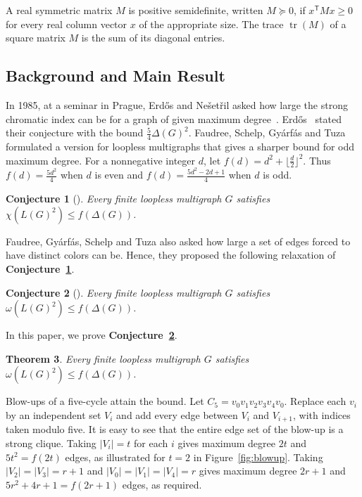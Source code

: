 \documentclass[preprint,11pt,numbers]{elsarticle-arxiv}
\numberwithin{equation}{section}
\newtheorem{theorem}{Theorem}[section]
\newtheorem{conjecture}[theorem]{Conjecture}
\theoremstyle{definition}
\DeclareMathOperator{\tr}{tr}
\begin{document}
A real symmetric matrix $M$ is positive semidefinite, written
$M\succeq0$, if $x^{\mathsf T}Mx\geq0$ for every real column vector
$x$ of the appropriate size. The trace $\tr(M)$ of a square matrix
$M$ is the sum of its diagonal entries.

\subsection{Background and Main Result}\label{sec:background}

In 1985, at a seminar in Prague, Erd\H{o}s and Ne\v{s}et\v{r}il asked
how large the strong chromatic index can be for a graph of given
maximum degree~\cite{FGST1989,ErdosNesetril1989}. Erd\H{o}s~\cite{Erdos1988}
stated their conjecture with the bound $\frac{5}{4}\Delta(G)^2$.
Faudree, Schelp, Gy\'arf\'as and Tuza~\cite{FGST1990} formulated a
version for loopless multigraphs that gives a sharper bound for odd
maximum degree. For a nonnegative integer $d$, let
$f(d)=d^2+\lfloor\frac{d}{2}\rfloor^2$. Thus $f(d)=\frac{5d^2}{4}$
when $d$ is even and $f(d)=\frac{5d^2-2d+1}{4}$ when $d$ is odd.

\begin{conjecture}[\cite{FGST1990}]
\label{conj:strong-edge-coloring}
Every finite loopless multigraph $G$ satisfies
$\chi(L(G)^2)\leq f(\Delta(G))$.
\end{conjecture}

Faudree, Gy\'arf\'as, Schelp and Tuza also asked how large a set of edges
forced to have distinct colors can be. Hence, they proposed the following
relaxation of \textbf{Conjecture~\ref{conj:strong-edge-coloring}}.

\begin{conjecture}[\cite{FGST1990}]\label{conj:fgst}
Every finite loopless multigraph $G$ satisfies
$\omega(L(G)^2)\leq f(\Delta(G))$.
\end{conjecture}

In this paper, we prove \textbf{Conjecture~\ref{conj:fgst}}.

\begin{theorem}\label{thm:multigraph}
Every finite loopless multigraph $G$ satisfies
$\omega(L(G)^2)\leq f(\Delta(G))$.
\end{theorem}

Blow-ups of a five-cycle attain the bound. Let $C_5=v_0v_1v_2v_3v_4v_0$. Replace each $v_i$ by an independent set $V_i$ and add every edge between $V_i$ and $V_{i+1}$, with indices taken modulo five. It is easy to see that the entire edge set of the blow-up is a strong clique. Taking $|V_i|=t$ for each $i$ gives
maximum degree $2t$ and $5t^2=f(2t)$ edges, as illustrated for
$t=2$ in Figure~\ref{fig:blowup}. Taking $|V_2|=|V_3|=r+1$ and
$|V_0|=|V_1|=|V_4|=r$ gives maximum degree $2r+1$ and
$5r^2+4r+1=f(2r+1)$ edges, as required.
\end{document}
